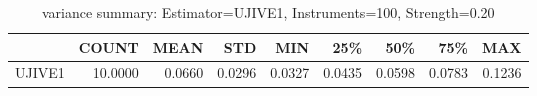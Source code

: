 \begin{table}[ht]
\centering
\caption{variance summary: Estimator=UJIVE1, Instruments=100, Strength=0.20}
\begin{tabular}{lrrrrrrrr}
\toprule
 & COUNT & MEAN & STD & MIN & 25\% & 50\% & 75\% & MAX \\
\midrule
UJIVE1 & 10.0000 & 0.0660 & 0.0296 & 0.0327 & 0.0435 & 0.0598 & 0.0783 & 0.1236 \\
\bottomrule
\end{tabular}
\end{table}
